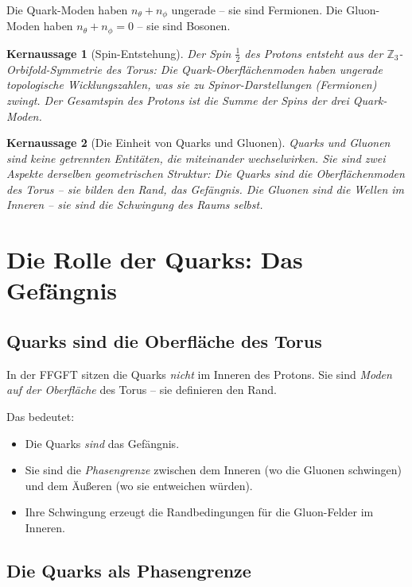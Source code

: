 \documentclass[11pt,a4paper]{article}
\newtheorem{keyresult}{Kernaussage}
\begin{document}
	Die Quark-Moden haben \(n_\theta + n_\phi\) ungerade -- sie sind Fermionen. 
	Die Gluon-Moden haben \(n_\theta + n_\phi = 0\) -- sie sind Bosonen.
	
	\begin{keyresult}[Spin-Entstehung]
		Der Spin \(\frac{1}{2}\) des Protons entsteht aus der \(\mathbb{Z}_3\)-Orbifold-Symmetrie des Torus: 
		Die Quark-Oberflächenmoden haben ungerade topologische Wicklungszahlen, 
		was sie zu Spinor-Darstellungen (Fermionen) zwingt. 
		Der Gesamtspin des Protons ist die Summe der Spins der drei Quark-Moden.
	\end{keyresult}
	
	\begin{keyresult}[Die Einheit von Quarks und Gluonen]
		Quarks und Gluonen sind keine getrennten Entitäten, die miteinander wechselwirken. 
		Sie sind zwei Aspekte derselben geometrischen Struktur: 
		Die Quarks sind die \emph{Oberflächenmoden} des Torus -- sie bilden den Rand, das Gefängnis. 
		Die Gluonen sind die \emph{Wellen im Inneren} -- sie sind die Schwingung des Raums selbst.
	\end{keyresult}
	
	\section{Die Rolle der Quarks: Das Gefängnis}
	
	\subsection{Quarks sind die Oberfläche des Torus}
	
	In der FFGFT sitzen die Quarks \emph{nicht} im Inneren des Protons. 
	Sie sind \emph{Moden auf der Oberfläche} des Torus -- sie definieren den Rand.
	
	Das bedeutet:
	\begin{itemize}
		\item Die Quarks \emph{sind} das Gefängnis.
		\item Sie sind die \emph{Phasengrenze} zwischen dem Inneren (wo die Gluonen schwingen) und dem Äußeren (wo sie entweichen würden).
		\item Ihre Schwingung erzeugt die Randbedingungen für die Gluon-Felder im Inneren.
	\end{itemize}
	
	\subsection{Die Quarks als Phasengrenze}
	
\end{document}
